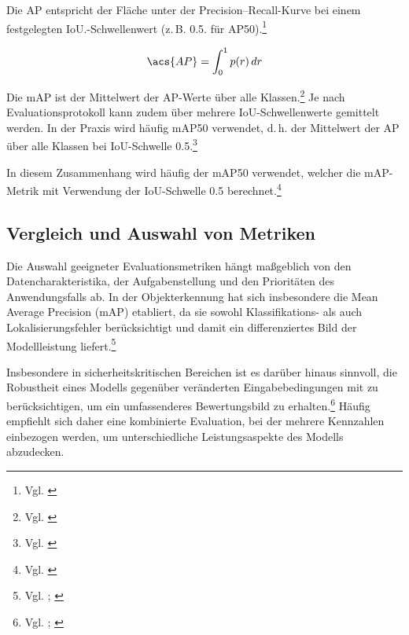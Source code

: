 Die \ac{AP} entspricht der Fläche unter der Precision–Recall-Kurve bei einem festgelegten \ac{IoU}.-Schwellenwert (z.\,B. 0.5. für \ac{AP}50).\footnote{Vgl. \cite[13]{zaripov_creation_2025}}

\[
\acs{AP} = \int_0^1 p(r) \, dr
\]

Die \ac{mAP} ist der Mittelwert der \ac{AP}-Werte über alle Klassen.\footnote{Vgl. \cite[14]{zaripov_creation_2025}} Je nach Evaluationsprotokoll kann zudem über mehrere \ac{IoU}-Schwellenwerte gemittelt werden. In der Praxis wird häufig \ac{mAP}50 verwendet, d.\,h. der Mittelwert der \ac{AP} über alle Klassen bei \ac{IoU}-Schwelle 0.5.\footnote{Vgl. \cite[S. 13 f.]{zaripov_creation_2025}}

In diesem Zusammenhang wird häufig der \ac{mAP}50 verwendet, welcher die \ac{mAP}-Metrik mit Verwendung der \ac{IoU}-Schwelle 0.5 berechnet.\footnote{Vgl. \cite[S. 13]{zaripov_creation_2025}}


\subsection{Vergleich und Auswahl von Metriken}

Die Auswahl geeigneter Evaluationsmetriken hängt maßgeblich von den Datencharakteristika, der Aufgabenstellung und den Prioritäten des Anwendungsfalls ab. In der Objekterkennung hat sich insbesondere die Mean Average Precision (\ac{mAP}) etabliert, da sie sowohl Klassifikations- als auch Lokalisierungsfehler berücksichtigt und damit ein differenziertes Bild der Modellleistung liefert.\footnote{Vgl. \cite[S. 65240]{arslanoglu_vision_2025}; \cite[S. 94272]{khanam_comprehensive_2024}} 

Insbesondere in sicherheitskritischen Bereichen ist es darüber hinaus sinnvoll, die Robustheit eines Modells gegenüber veränderten Eingabebedingungen mit zu berücksichtigen, um ein umfassenderes Bewertungsbild zu erhalten.\footnote{Vgl. \cite[S. 65234]{arslanoglu_vision_2025}; \cite[S. 105282]{ali_adversarial_2024}} Häufig empfiehlt sich daher eine kombinierte Evaluation, bei der mehrere Kennzahlen einbezogen werden, um unterschiedliche Leistungsaspekte des Modells abzudecken.
